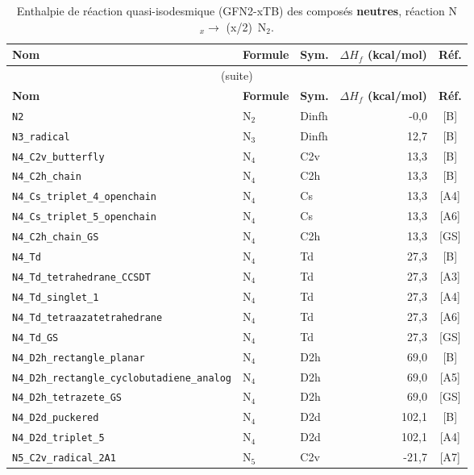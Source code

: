 \begin{longtable}{@{}p{4.6cm}lp{1.4cm}rc@{}}
\caption{Enthalpie de r\'eaction quasi-isodesmique (GFN2-xTB) des compos\'es \textbf{neutres}, r\'eaction N$_x \to$ (x/2)~N$_2$.}
\label{tab:isodesmic-neutre}\\
\toprule
\textbf{Nom} & \textbf{Formule} & \textbf{Sym.} & \textbf{$\Delta H_f$ (kcal/mol)} & \textbf{R\'ef.} \\
\midrule
\endfirsthead
\multicolumn{5}{c}{\small (suite)}\\
\toprule
\textbf{Nom} & \textbf{Formule} & \textbf{Sym.} & \textbf{$\Delta H_f$ (kcal/mol)} & \textbf{R\'ef.} \\
\midrule
\endhead
\bottomrule
\endfoot
\bottomrule
\endlastfoot
\addlinespace
\texttt{N2} & N$_{2}$ & Dinfh & -0{,}0 & [B] \\
\addlinespace
\texttt{N3\_radical} & N$_{3}$ & Dinfh & 12{,}7 & [B] \\
\addlinespace
\texttt{N4\_C2v\_butterfly} & N$_{4}$ & C2v & 13{,}3 & [B] \\
\texttt{N4\_C2h\_chain} & N$_{4}$ & C2h & 13{,}3 & [B] \\
\texttt{N4\_Cs\_triplet\_4\_openchain} & N$_{4}$ & Cs & 13{,}3 & [A4] \\
\texttt{N4\_Cs\_triplet\_5\_openchain} & N$_{4}$ & Cs & 13{,}3 & [A6] \\
\texttt{N4\_C2h\_chain\_GS} & N$_{4}$ & C2h & 13{,}3 & [GS] \\
\texttt{N4\_Td} & N$_{4}$ & Td & 27{,}3 & [B] \\
\texttt{N4\_Td\_tetrahedrane\_CCSDT} & N$_{4}$ & Td & 27{,}3 & [A3] \\
\texttt{N4\_Td\_singlet\_1} & N$_{4}$ & Td & 27{,}3 & [A4] \\
\texttt{N4\_Td\_tetraazatetrahedrane} & N$_{4}$ & Td & 27{,}3 & [A6] \\
\texttt{N4\_Td\_GS} & N$_{4}$ & Td & 27{,}3 & [GS] \\
\texttt{N4\_D2h\_rectangle\_planar} & N$_{4}$ & D2h & 69{,}0 & [B] \\
\texttt{N4\_D2h\_rectangle\_cyclobutadiene\_analog} & N$_{4}$ & D2h & 69{,}0 & [A5] \\
\texttt{N4\_D2h\_tetrazete\_GS} & N$_{4}$ & D2h & 69{,}0 & [GS] \\
\texttt{N4\_D2d\_puckered} & N$_{4}$ & D2d & 102{,}1 & [B] \\
\texttt{N4\_D2d\_triplet\_5} & N$_{4}$ & D2d & 102{,}1 & [A4] \\
\addlinespace
\texttt{N5\_C2v\_radical\_2A1} & N$_{5}$ & C2v & -21{,}7 & [A7] \\

\end{longtable}
